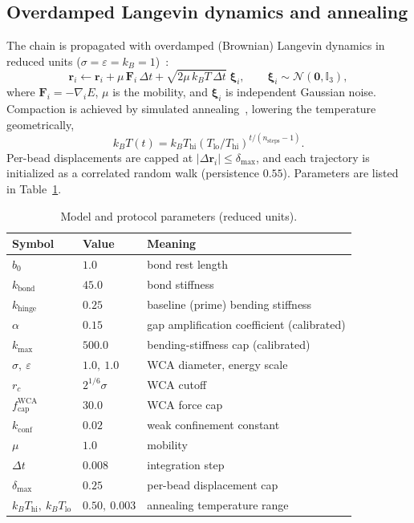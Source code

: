 \documentclass[11pt]{article}
\begin{document}
\subsection{Overdamped Langevin dynamics and annealing}
The chain is propagated with overdamped (Brownian) Langevin dynamics in reduced
units ($\sigma = \varepsilon = k_B = 1$)~\cite{Ermak}:
\begin{equation}
\mathbf{r}_i \leftarrow \mathbf{r}_i + \mu\,\mathbf{F}_i\,\Delta t
+ \sqrt{2\mu\, k_B T\, \Delta t}\;\boldsymbol{\xi}_i,\qquad
\boldsymbol{\xi}_i \sim \mathcal{N}(\mathbf{0}, \mathbb{I}_3),
\end{equation}
where $\mathbf{F}_i = -\nabla_i E$, $\mu$ is the mobility, and $\boldsymbol{\xi}_i$
is independent Gaussian noise. Compaction is achieved by simulated
annealing~\cite{Kirkpatrick}, lowering the temperature geometrically,
\begin{equation}
k_B T(t) = k_B T_{\text{hi}} \left(T_{\text{lo}}/T_{\text{hi}}\right)^{t/(n_{\text{steps}}-1)} .
\end{equation}
Per-bead displacements are capped at $\lvert\Delta\mathbf{r}_i\rvert \le \delta_{\max}$,
and each trajectory is initialized as a correlated random walk (persistence $0.55$).
Parameters are listed in Table~\ref{tab:params}.

\begin{table}[htbp]
\centering
\caption{Model and protocol parameters (reduced units).}
\label{tab:params}
\begin{tabular}{lll}
\toprule
Symbol & Value & Meaning \\
\midrule
$b_0$ & $1.0$ & bond rest length \\
$k_{\text{bond}}$ & $45.0$ & bond stiffness \\
$k_{\text{hinge}}$ & $0.25$ & baseline (prime) bending stiffness \\
$\alpha$ & $0.15$ & gap amplification coefficient (calibrated) \\
$k_{\max}$ & $500.0$ & bending-stiffness cap (calibrated) \\
$\sigma,\ \varepsilon$ & $1.0,\ 1.0$ & WCA diameter, energy scale \\
$r_c$ & $2^{1/6}\sigma$ & WCA cutoff \\
$f_{\text{cap}}^{\text{WCA}}$ & $30.0$ & WCA force cap \\
$k_{\text{conf}}$ & $0.02$ & weak confinement constant \\
$\mu$ & $1.0$ & mobility \\
$\Delta t$ & $0.008$ & integration step \\
$\delta_{\max}$ & $0.25$ & per-bead displacement cap \\
$k_B T_{\text{hi}},\ k_B T_{\text{lo}}$ & $0.50,\ 0.003$ & annealing temperature range \\
\bottomrule
\end{tabular}
\end{table}
\end{document}
